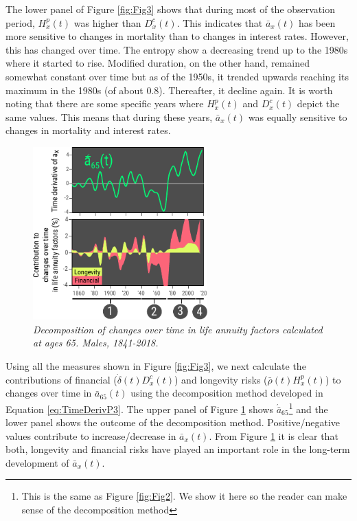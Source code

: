 \documentclass[12pt]{article}
\begin{document}
The lower panel of Figure \ref{fig:Fig3} shows that during most of the observation period, ${H}^{p}_x(t)$ was higher than ${D}^{c}_x(t)$. This indicates that $\bar{a}_x(t)$ has been more sensitive to changes in mortality than to changes in interest rates. However, this has changed over time. The entropy show a decreasing trend up to the 1980s where it started to rise. Modified duration, on the other hand, remained somewhat constant over time but as of the 1950s, it trended upwards reaching its maximum in the 1980s (of about 0.8). Thereafter, it decline again. It is worth noting that there are some specific years where ${H}^{p}_x(t)$ and ${D}^{c}_x(t)$ depict the same values. This means that during these years, $\bar{a}_x(t)$ was equally sensitive to changes in mortality and interest rates.


\begin{figure}[!ht]
	\centering
	\includegraphics[width=0.6\textwidth]{Fig/Fig4}
	\caption{\textit{Decomposition of changes over time in life annuity factors calculated at ages 65. Males, 1841-2018.}}
	\label{fig:Fig4}
\end{figure}

Using all the measures shown in Figure \ref{fig:Fig3}, we next calculate the contributions of financial ($\dot{\delta}(t){D}^{c}_x(t)$) and longevity risks ($\bar{\rho}(t){H}^{p}_x(t)$) to changes over time in $\bar{a}_{65}(t)$ using the decomposition method developed in Equation \ref{eq:TimeDerivP3}. The upper panel of Figure \ref{fig:Fig4} shows $\acute{\bar{a}}_{65}$\footnote{This is the same as Figure \ref{fig:Fig2}. We show it here so the reader can make sense of the decomposition method} and the lower panel shows the outcome of the decomposition method. Positive/negative values contribute to increase/decrease in $\bar{a}_x(t)$. From Figure \ref{fig:Fig4} it is clear that both, longevity and financial risks have played an important role in the long-term development of $\bar{a}_x(t)$. 
\end{document}
